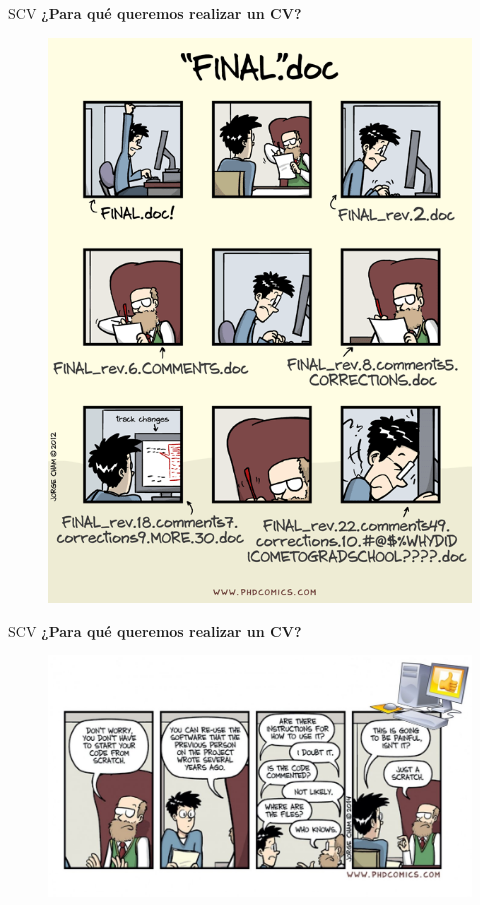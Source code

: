 \documentclass{beamer}
\begin{document}
\begin{frame}{SCV}
\textbf{¿Para qué queremos realizar un CV?}

\begin{figure}
    \centering
    \includegraphics[scale=0.35]{SCV.png}
\end{figure}
\end{frame}

\begin{frame}{SCV}
\textbf{¿Para qué queremos realizar un CV?}
\begin{figure}
    \centering
    \includegraphics[scale=0.35]{codigo.jpg}
\end{figure}
\end{frame}
\end{document}
